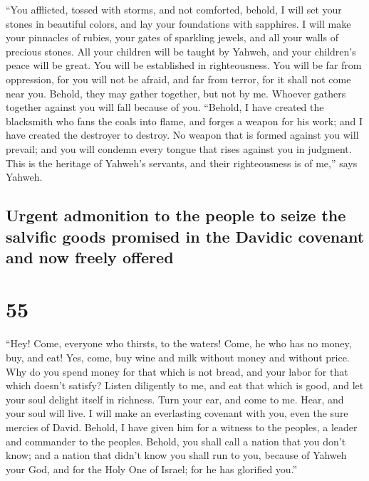  ``You afflicted, tossed with storms, and not comforted,
behold, I will set your stones in beautiful colors, and lay your
foundations with sapphires.  I will make your pinnacles
of rubies, your gates of sparkling jewels, and all your walls of
precious stones.  All your children will be taught by
Yahweh, and your children's peace will be great.  You
will be established in righteousness. You will be far from oppression,
for you will not be afraid, and far from terror, for it shall not come
near you.  Behold, they may gather together, but not by
me. Whoever gathers together against you will fall because of you.
 ``Behold, I have created the blacksmith who fans the
coals into flame, and forges a weapon for his work; and I have created
the destroyer to destroy.  No weapon that is formed
against you will prevail; and you will condemn every tongue that rises
against you in judgment. This is the heritage of Yahweh's servants, and
their righteousness is of me,'' says Yahweh.

\hypertarget{urgent-admonition-to-the-people-to-seize-the-salvific-goods-promised-in-the-davidic-covenant-and-now-freely-offered}{%
\subsection{Urgent admonition to the people to seize the salvific goods
promised in the Davidic covenant and now freely
offered}\label{urgent-admonition-to-the-people-to-seize-the-salvific-goods-promised-in-the-davidic-covenant-and-now-freely-offered}}

\hypertarget{section-54}{%
\section{55}\label{section-54}}

 ``Hey! Come, everyone who thirsts, to the waters! Come,
he who has no money, buy, and eat! Yes, come, buy wine and milk without
money and without price.  Why do you spend money for that
which is not bread, and your labor for that which doesn't satisfy?
Listen diligently to me, and eat that which is good, and let your soul
delight itself in richness.  Turn your ear, and come to
me. Hear, and your soul will live. I will make an everlasting covenant
with you, even the sure mercies of David.  Behold, I have
given him for a witness to the peoples, a leader and commander to the
peoples.  Behold, you shall call a nation that you don't
know; and a nation that didn't know you shall run to you, because of
Yahweh your God, and for the Holy One of Israel; for he has glorified
you.''

